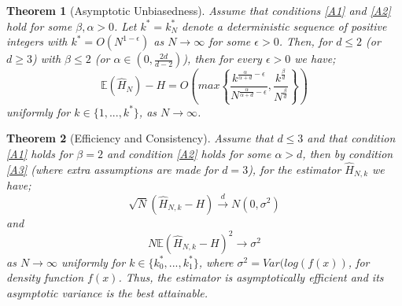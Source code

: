 \documentclass{report}
\newtheorem{theorem}{Theorem}
\begin{document}
\begin{theorem}[Asymptotic Unbiasedness] \label{unbias}
Assume that conditions \ref{A1} and \ref{A2} hold for some $\beta, \alpha > 0$. Let  $k^{*} = k_{N}^{*}$ denote a deterministic sequence of positive integers with $k^{*} = O(N^{1-\epsilon})$ as $N \to \infty$  for some $\epsilon > 0$. Then, for $d \leq 2$ (or $d \geq 3$) with $\beta \leq 2$ (or $\alpha \in (0, \frac{2d}{d-2})$), then for every $\epsilon >0$ we have;
\begin{equation}
\mathbb{E} ( \hat{H}_{N} ) - H = O \left( max \left\{ \frac{k^{\frac{\alpha}{\alpha + d} - \epsilon}}{N^{\frac{\alpha}{\alpha + d} - \epsilon}}, \frac{k^{\frac{\beta}{d}}}{N^{\frac{\beta}{d}}} \right\} \right)
\end{equation}
uniformly for $k \in \{1, ..., k^{*}\}$, as $N \to \infty$.
\end{theorem}


\begin{theorem}[Efficiency and Consistency] \label{efficient}
Assume that $d \leq 3$ and that condition \ref{A1} holds for $\beta = 2$ and condition \ref{A2} holds for some $\alpha > d$, then by condition \ref{A3} (where extra assumptions are made for $d=3$), for the estimator $\hat{H}_{N, k}$ we have;
\begin{equation} \label{efficiency_equation}
\sqrt{N}(\hat{H}_{N, k} - H) \xrightarrow{d} N(0, \sigma^2)
\end{equation}
and 
\begin{equation} \label{consistency_equation}
N \mathbb{E}{(\hat{H}_{N, k} - H)^2} \xrightarrow{} \sigma^2
\end{equation}
as $N \to \infty$ uniformly for $k \in \{ k_{0}^{*}, ...,  k_{1}^{*} \}$, where $\sigma^2 = Var(log(f(x))$, for density function $f(x)$. Thus, the estimator is asymptotically efficient and its asymptotic variance is the best attainable.
\end{theorem}
\end{document}

